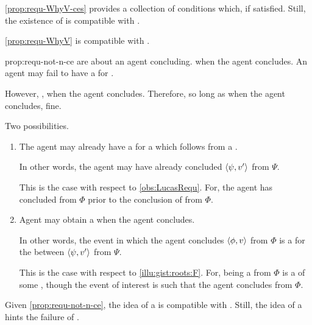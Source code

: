 \begin{note}
  \autoref{prop:requ-WhyV-ces} provides a collection of conditions which, if satisfied.
  Still, the existence of  is compatible with \issueInclusion{}.

  \begin{observation}%
    \label{prop:requ-not-n-ce}%
    \autoref{prop:requ-WhyV} is compatible with \issueInclusion{}.
  \end{observation}

  \begin{motivation}{prop:requ-not-n-ce}
     are about an agent concluding.
    \fc{} when the agent concludes.
    An agent may fail to have a \wit{} for \fc{}.

    However, \issueInclusion{}, \wit{} when the agent concludes.
    Therefore, so long as \wit{} when the agent concludes, fine.

    Two possibilities.
    \begin{enumerate}
    \item
      The agent may already have a \wit{} for a \ros{} which follows from a \fc{}.

      In other words, the agent may have already concluded \(\langle\psi, v'\rangle\) from \(\Psi\).

      This is the case with respect to \autoref{obs:LucasRequ}.
      For, the agent has concluded  from \(\Phi\) prior to the \agents{} conclusion of  from \(\Phi\).
    \item
      Agent may obtain a \wit{} when the agent concludes.

      In other words, the event in which the agent concludes \(\langle\phi, v\rangle\) from \(\Phi\) is a \wit{} for the \ros{} between \(\langle\psi, v'\rangle\) from \(\Psi\).

      This is the case with respect to \autoref{illu:gist:roots:F}.
      For,  being a \fc{} from \(\Phi\) is a \requ{} of some \se{}, though the event of interest is such that the agent concludes  from \(\Phi\).
    \end{enumerate}
    \vspace{-\baselineskip}
  \end{motivation}
\end{note}


\begin{note}
  Given \autoref{prop:requ-not-n-ce}, the idea of a \requ{} is compatible with \issueInclusion{}.
  Still, the idea of a  hints the failure of \issueInclusion{}.
\end{note}


